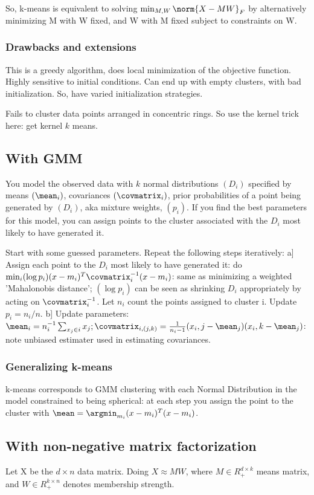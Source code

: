\documentclass[oneside, article]{memoir}
\begin{document}
So, k-means is equivalent to solving $\min_{M, W} \norm{X - MW}_F$ by alternatively minimizing M with W fixed, and W with M fixed subject to constraints on W.

\subsubsection{Drawbacks and extensions}
This is a greedy algorithm, does local minimization of the objective function. Highly sensitive to initial conditions. Can end up with empty clusters, with bad initialization. So, have varied initialization strategies.

Fails to cluster data points arranged in concentric rings. So use the kernel trick here: get kernel $k$ means.

\subsection{With GMM}
You model the observed data with $k$ normal distributions $(D_i)$ specified by means $(\mean_i)$, covariances $(\covmatrix_i)$, prior probabilities of a point being generated by $(D_i)$, aka mixture weights, $(p_i)$. If you find the best parameters for this model, you can assign points to the cluster associated with the $D_i$ most likely to have generated it.

Start with some guessed parameters. Repeat the following steps iteratively: a] Assign each point to the $D_i$ most likely to have generated it: do $\min_i (\log p_i) (x-m_i)^{T}\covmatrix_i^{-1}(x-m_i)$: same as minimizing a weighted 'Mahalonobis distance'; $(\log p_i)$ can be seen as shrinking $D_i$ appropriately by acting on $\covmatrix_i^{-1}$. Let $n_i$ count the points assigned to cluster i. Update $p_i = n_i/n$. b] Update parameters: $\mean_i = n_i^{-1}\sum_{x_j \in i} x_j; \covmatrix_{i, (j, k)} = \frac{1}{n_i-1}(x_i,j - \mean_j)(x_i,k - \mean_j)$: note unbiased estimater used in estimating covariances.

\subsubsection{Generalizing k-means}
k-means corresponds to GMM clustering with each Normal Distribution in the model constrained to being spherical: at each step you assign the point to the cluster with $\mean = \argmin_{m_i} (x-m_i)^{T}(x-m_i)$.

\subsection{With non-negative matrix factorization}
Let X be the $d \times n$ data matrix. Doing $X \approx MW$, where $M \in R_+^{d \times k}$ means matrix, and $W \in R_+^{k\times n}$ denotes membership strength.
\end{document}
